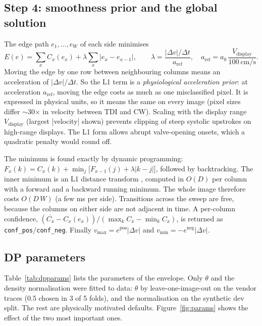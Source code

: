 \documentclass[10pt,a4paper]{article}
\newcommand{\code}[1]{\texttt{\small #1}}
\newcommand{\vmax}{v_{\max}}
\newcommand{\vmin}{v_{\min}}
\begin{document}
\subsection{Step 4: smoothness prior and the global solution}
The edge path $e_1,\dots,e_W$ of each side minimises
\begin{equation}
E(e) = \sum_x C_x(e_x) + \lambda \sum_{x} |e_x - e_{x-1}|, \qquad
\lambda = \frac{|\Delta v|/\Delta t}{a_{\mathrm{ref}}}, \quad
a_{\mathrm{ref}} = a_0\,\frac{V_{\mathrm{display}}}{100~\mathrm{cm/s}}.
\end{equation}
Moving the edge by one row between neighbouring columns means an acceleration of $|\Delta v|/\Delta t$. So the L1 term is a
\emph{physiological acceleration prior}: at acceleration $a_{\mathrm{ref}}$, moving the edge costs as much as one
misclassified pixel. It is expressed in physical units, so it means the same on every image (pixel sizes differ $\sim$30$\times$ in
velocity between TDI and CW). Scaling with the display range $V_{\mathrm{display}}$ (largest |velocity| shown) prevents clipping of steep
systolic upstrokes on high-range displays. The L1 form allows abrupt valve-opening onsets, which a quadratic penalty would round off.

The minimum is found exactly by dynamic programming:
$F_x(k) = C_x(k) + \min_j \big[F_{x-1}(j) + \lambda|k-j|\big]$, followed by backtracking. The inner minimum is an L1
distance transform \cite{felzenszwalb}, computed in $O(D)$ per column with a forward and a backward running minimum. The whole
image therefore costs $O(D\,W)$ (a few ms per side). Transitions across the sweep are free, because the columns on either side are not
adjacent in time. A per-column confidence, $(\overline{C_x} - C_x(e_x)) / (\max_k C_x - \min_k C_x)$, is returned as
\code{conf\_pos}/\code{conf\_neg}. Finally $\vmax = e^{\mathrm{pos}}|\Delta v|$ and $\vmin = -e^{\mathrm{neg}}|\Delta v|$.

\subsection{DP parameters}
Table~\ref{tab:dpparams} lists the parameters of the envelope. Only $\theta$ and the density normalisation were fitted to data:
$\theta$ by leave-one-image-out on the vendor traces (0.5 chosen in 3 of 5 folds), and the normalisation on the synthetic dev split.
The rest are physically motivated defaults. Figure~\ref{fig:params} shows the effect of the two most important ones.
\end{document}
